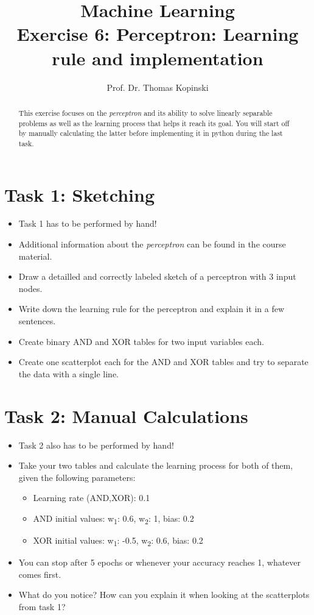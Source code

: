 \documentclass{article}
\title{Machine Learning \\ Exercise 6: Perceptron: Learning rule and implementation}
\author{Prof. Dr. Thomas Kopinski}
\begin{document}
\maketitle

\begin{abstract}
This exercise focuses on the \emph{perceptron} and its ability to solve linearly separable problems as well as the learning process that helps it reach its goal.  You will start off by manually calculating the latter before implementing it in python during the last task.
\end{abstract}

\section*{Task 1: Sketching}
\begin{itemize}
    \item Task 1 has to be performed by hand!
    \item Additional information about the \emph{perceptron} can be found in the course material.
    \item Draw a detailled and correctly labeled sketch of a perceptron with 3 input nodes.
    \item Write down the learning rule for the perceptron and explain it in a few sentences.
    \item Create binary AND and XOR tables for two input variables each.
    \item Create one scatterplot each for the AND and XOR tables and try to separate the data with a single line.
\end{itemize}

\section*{Task 2: Manual Calculations}
\begin{itemize}
    \item Task 2 also has to be performed by hand! 
    \item Take your two tables and calculate the learning process for both of them, given the following parameters:
    \begin{itemize}
        \item Learning rate (AND,XOR): 0.1
        \item AND initial values: w\textsubscript{1}: 0.6, w\textsubscript{2}: 1, bias: 0.2
        \item XOR initial values: w\textsubscript{1}: -0.5, w\textsubscript{2}: 0.6, bias: 0.2
    \end{itemize}
    \item You can stop after 5 epochs or whenever your accuracy reaches 1, whatever comes first.
    \item What do you notice? How can you explain it when looking at the scatterplots from task 1?
\end{itemize}
\end{document}
